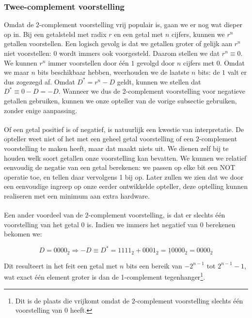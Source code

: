 \subsubsection{Twee-complement voorstelling}
Omdat de $2$-complement voorstelling vrij populair is, gaan we er nog wat dieper op in. Bij een getalstelsl met radix $r$ en een getal met $n$ cijfers, kunnen we $r^n$ getallen voorstellen. Een logisch gevolg is dat we getallen groter of gelijk aan $r^n$ niet voorstellen: $0$ wordt immers ook voorgesteld. Daarom stellen we dat $r^n\equiv 0$. We kunnen $r^n$ immer voorstellen door \'e\'en $1$ gevolgd door $n$ cijfers met $0$. Omdat we maar $n$ bits beschikbaar hebben, weerhouden we de laatste $n$ bits: de $1$ valt er dus zogezegd af. Omdat $D^*=r^n-D$ geldt, kunnen we stellen dat $D^*\equiv 0-D=-D$. Wanneer we dus de 2-complement voorstelling voor negatieve getallen gebruiken, kunnen we onze opteller van de vorige subsectie gebruiken, zonder enige aanpassing.

\paragraph{}
Of een getal positief is of negatief, is natuurlijk een kwestie van interpretatie. De opteller weet niet of het met een geheel getal voorstelling of een $2$-complement voorstelling te maken heeft, maar dat maakt niets uit. We dienen zelf bij te houden welk soort getallen onze voorstelling kan bevatten. We kunnen we relatief eenvoudig de negatie van een getal berekenen: we passen op elke bit een NOT operatie toe, en tellen daar vervolgens 1 bij op. Later zullen we zien dat we door een eenvoudige ingreep op onze eerder ontwikkelde opteller, deze optelling kunnen realiseren met een minimum aan extra hardware.

\paragraph{}
Een ander voordeel van de $2$-complement voorstelling, is dat er slechts \'e\'en voorstelling van het getal $0$ is. Indien we immers het negatief van $0$ berekenen bekomen we:

\begin{equation}
D=0000_2\Rightarrow -D\equiv D^*=1111_2+0001_2=\underline{1}0000_2=0000_2
\end{equation}

Dit resulteert in het feit een getal met $n$ bits een bereik van $-2^{n-1}$ tot $2^{n-1}-1$, wat exact \'e\'en element groter is dan de 1-complement tegenhanger\footnote{Dit is de plaats die vrijkomt omdat de 2-complement voorstelling slechts \'e\'en voorstelling van 0 heeft.}.

